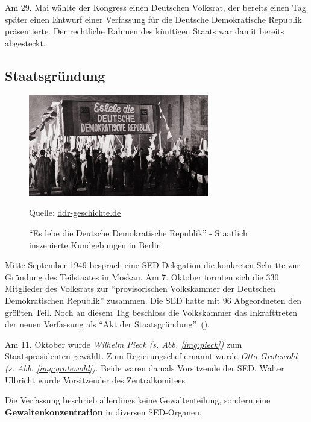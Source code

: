\documentclass[12pt,a4paper]{article}
\begin{document}
Am 29. Mai wählte der Kongress einen Deutschen Volksrat, der bereits einen Tag später einen Entwurf einer Verfassung für die Deutsche Demokratische Republik präsentierte. Der rechtliche Rahmen des künftigen Staats war damit bereits abgesteckt.


\subsection{Staatsgründung}
\label{anfaenge:staatsgruendung}

\begin{figure}
    \centering
    \includegraphics[width=0.7\textwidth]{Bilder/gruendungddr102_v-contentgross.jpg}
    \caption{\enquote{Es lebe die Deutsche Demokratische Republik} - Staatlich inszenierte Kundgebungen in Berlin}
    Quelle: \url{ddr-geschichte.de}
    \label{img:gruendung}
\end{figure}

Mitte September 1949 besprach eine SED-Delegation die konkreten Schritte zur Gründung des Teilstaates in Moskau. Am 7. Oktober formten sich die 330 Mitglieder des Volksrats zur \enquote{provisorischen Volkskammer der Deutschen Demokratischen Republik} zusammen. Die SED hatte mit 96 Abgeordneten den größten Teil. Noch an diesem Tag beschloss die Volkskammer das Inkrafttreten der neuen Verfassung als \enquote{Akt der Staatsgründung}~(\cite{izpb:ausbau-system}). 

Am 11. Oktober wurde \textit{Wilhelm Pieck (s. Abb. \ref{img:pieck})} zum Staatspräsidenten gewählt. Zum Regierungschef ernannt wurde \textit{Otto Grotewohl (s. Abb. \ref{img:grotewohl})}. Beide waren damals Vorsitzende der SED. Walter Ulbricht wurde Vorsitzender des Zentralkomitees

Die Verfassung beschrieb allerdings keine Gewaltenteilung, sondern eine \textbf{Gewaltenkonzentration} in diversen SED-Organen.
\end{document}
